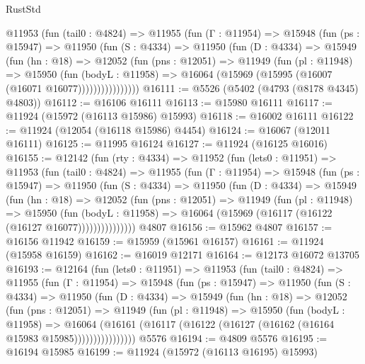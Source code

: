 \begin{lexlean}{RustStd}
\begin{coremodule}
        @11953
          (fun (tail0 : @4824) =>
          @11955
            (fun (Γ : @11954) =>
            @15948
              (fun (ps : @15947) =>
              @11950
                (fun (S : @4334) =>
                @11950
                  (fun (D : @4334) =>
                  @15949
                    (fun (hn : @18) =>
                    @12052
                      (fun (pns : @12051) =>
                      @11949
                        (fun (pl : @11948) =>
                        @15950
                          (fun (bodyL : @11958) =>
                          @16064 (@15969 (@15995 (@16007 (@16071 @16077))))))))))))))))
@16111 := @5526 (@5402 (@4793 (@8178 @4345) @4803))
@16112 := @16106 @16111
@16113 := @15980 @16111
@16117 := @11924 (@15972 (@16113 @15986) @15993)
@16118 := @16002 @16111
@16122 := @11924 (@12054 (@16118 @15986) @4454)
@16124 := @16067 (@12011 @16111)
@16125 := @11995 @16124
@16127 := @11924 (@16125 @16016)
@16155 := @12142
    (fun (rty : @4334) =>
    @11952
      (fun (lets0 : @11951) =>
      @11953
        (fun (tail0 : @4824) =>
        @11955
          (fun (Γ : @11954) =>
          @15948
            (fun (ps : @15947) =>
            @11950
              (fun (S : @4334) =>
              @11950
                (fun (D : @4334) =>
                @15949
                  (fun (hn : @18) =>
                  @12052
                    (fun (pns : @12051) =>
                    @11949
                      (fun (pl : @11948) =>
                      @15950
                        (fun (bodyL : @11958) =>
                        @16064 (@15969 (@16117 (@16122 (@16127 @16077)))))))))))))))
    @4807
@16156 := @15962 @4807
@16157 := @16156 @11942
@16159 := @15959 (@15961 @16157)
@16161 := @11924 (@15958 @16159)
@16162 := @16019 @12171
@16164 := @12173 @16072 @13705
@16193 := @12164
    (fun (lets0 : @11951) =>
    @11953
      (fun (tail0 : @4824) =>
      @11955
        (fun (Γ : @11954) =>
        @15948
          (fun (ps : @15947) =>
          @11950
            (fun (S : @4334) =>
            @11950
              (fun (D : @4334) =>
              @15949
                (fun (hn : @18) =>
                @12052
                  (fun (pns : @12051) =>
                  @11949
                    (fun (pl : @11948) =>
                    @15950
                      (fun (bodyL : @11958) =>
                      @16064
                        (@16161
                          (@16117 (@16122 (@16127 (@16162 (@16164 @15983 @15985))))))))))))))))
    @5576
@16194 := @4809 @5576
@16195 := @16194 @15985
@16199 := @11924 (@15972 (@16113 @16195) @15993)

\end{coremodule}
\end{lexlean}
